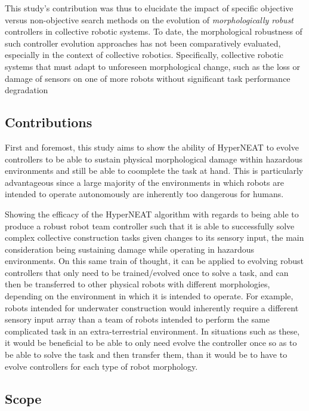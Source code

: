 This study's contribution was thus to elucidate the impact of specific objective versus non-objective search methods on the evolution of \textit{morphologically robust} controllers in collective robotic systems. 
To date, the morphological robustness of such controller evolution approaches has not been comparatively evaluated, especially in the context of collective robotics. 
Specifically, collective robotic systems that must adapt to unforeseen morphological change, such as the loss or damage of sensors on one of more robots without significant task performance degradation \cite{BongardZykovLipson2006} \cite{CullyCluneTaraporeMouret2015}


\subsection{Contributions}

First and foremost, this study aims to show the ability of HyperNEAT to evolve controllers to be able to sustain physical morphological damage within hazardous environments and still be able to coomplete the task at hand. This is particularly advantageous since a large majority of the environments in which robots are intended to operate autonomously are inherently too dangerous for humans.

Showing the efficacy of the HyperNEAT algorithm with regards to being able to produce a robust robot team controller such that it is able to successfully solve complex collective construction tasks given changes to its sensory input, the main consideration being sustaining damage while operating in hazardous environments. On this same train of thought, it can be applied to evolving robust controllers that only need to be trained/evolved once to solve a task, and can then be transferred to other physical robots with different morphologies, depending on the environment in which it is intended to operate. For example, robots intended for underwater construction would inherently require a different sensory input array than a team of robots intended to perform the same complicated task in an extra-terrestrial environment. In situations such as these, it would be beneficial to be able to only need evolve the controller once so as to be able to solve the task and then transfer them, than it would be to have to evolve controllers for each type of robot morphology.


\subsection{Scope}

